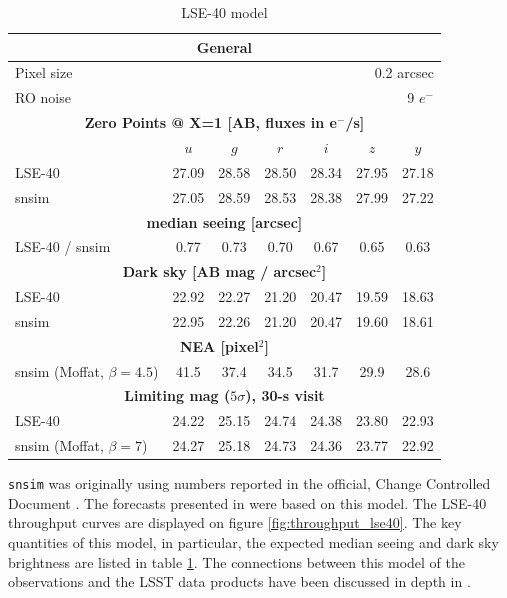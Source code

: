\documentclass[\docopts]{\docclass}
\begin{document}
\begin{table}[t]
\begin{center}
\caption{LSE-40 model}
\label{tab:lse40}
\begin{tabular}{l|cccccc}
\hline 
\hline 
\multicolumn{7}{c}{{\bf General}} \\
\hline
Pixel size & \multicolumn{6}{r}{0.2 arcsec} \\
RO noise   & \multicolumn{6}{r}{9 $e^-$}    \\
\hline
\multicolumn{7}{c}{{\bf Zero Points @ X=1 [AB, fluxes in e$^-$/s]}} \\
\hline
           &  $u$ & $g$ & $r$ & $i$ & $z$ & $y$ \\
LSE-40     & 27.09 & 28.58 & 28.50 & 28.34 & 27.95 & 27.18 \\
snsim      & 27.05 & 28.59 & 28.53 & 28.38 & 27.99 & 27.22 \\
\hline
\multicolumn{7}{c}{{\bf median seeing [arcsec]}} \\
\hline
LSE-40 / snsim  &  0.77 &  0.73 &  0.70 &  0.67 &  0.65 &  0.63 \\
\hline
\multicolumn{7}{c}{{\bf Dark sky [AB mag / arcsec$^2$]}}   \\
\hline
LSE-40     & 22.92 & 22.27 & 21.20 & 20.47 & 19.59 & 18.63 \\
snsim      & 22.95 & 22.26 & 21.20 & 20.47 & 19.60 & 18.61 \\
\hline
\multicolumn{7}{c}{{\bf NEA [pixel$^2$]}}   \\
\hline
snsim (Moffat, $\beta=4.5$)     & 41.5  & 37.4  & 34.5  & 31.7 & 29.9  & 28.6  \\
\hline
\multicolumn{7}{c}{{\bf Limiting mag ($5 \sigma$), 30-s visit}}   \\
\hline
LSE-40                        & 24.22  &  25.15 &  24.74  &  24.38  &  23.80  &  22.93  \\
snsim (Moffat, $\beta=7$)     & 24.27  &  25.18 &  24.73  &  24.36  &  23.77  &  22.92  \\
\hline
\end{tabular}
\end{center}
\end{table}


{\tt snsim} was originally using numbers reported in the official,
Change Controlled Document \cite[][LSE-40 hereafter]{LSE-40}.  The
forecasts presented in \cite{2014A&A...572A..80A} were based on this
model.  The LSE-40 throughput curves are displayed on figure
\ref{fig:throughput_lse40}.  The key quantities of this model, in
particular, the expected median seeing and dark sky brightness are
listed in table \ref{tab:lse40}.  The connections between this model
of the observations and the LSST data products have been discussed in
depth in \citep{2008arXiv0805.2366I}.
\end{document}
